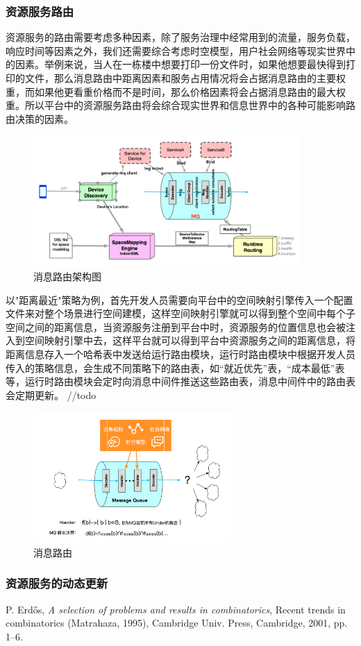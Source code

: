 \documentclass[a4paper]{article}
\theoremstyle{definition}
\begin{document}
\subsubsection{资源服务路由}
资源服务的路由需要考虑多种因素，除了服务治理中经常用到的流量，服务负载，响应时间等因素之外，我们还需要综合考虑时空模型，用户社会网络等现实世界中的因素。举例来说，当人在一栋楼中想要打印一份文件时，如果他想要最快得到打印的文件，那么消息路由中距离因素和服务占用情况将会占据消息路由的主要权重，而如果他更看重价格而不是时间，那么价格因素将会占据消息路由的最大权重。所以平台中的资源服务路由将会综合现实世界和信息世界中的各种可能影响路由决策的因素。
\begin{figure}[ht]
 \centering
 \includegraphics[height=5cm]{images/routing_1.png}
 \caption{消息路由架构图}
 \label{fig:singleblock}
\end{figure}
以"距离最近"策略为例，首先开发人员需要向平台中的空间映射引擎传入一个配置文件来对整个场景进行空间建模，这样空间映射引擎就可以得到整个空间中每个子空间之间的距离信息，当资源服务注册到平台中时，资源服务的位置信息也会被注入到空间映射引擎中去，这样平台就可以得到平台中资源服务之间的距离信息，将距离信息存入一个哈希表中发送给运行路由模块，运行时路由模块中根据开发人员传入的策略信息，会生成不同策略下的路由表，如“就近优先”表，“成本最低”表等，运行时路由模块会定时向消息中间件推送这些路由表，消息中间件中的路由表会定期更新。
//todo
\begin{figure}[ht]
 \centering
 \includegraphics[height=5cm]{images/routing.png}
 \caption{消息路由}
 \label{fig:singleblock}
\end{figure}
\subsubsection{资源服务的动态更新}

\newpage

\begin{thebibliography}{9}
 P. Erd\H os, \emph{A selection of problems and
results in combinatorics}, Recent trends in combinatorics (Matrahaza,
1995), Cambridge Univ. Press, Cambridge, 2001, pp. 1--6.
\end{thebibliography}
\end{document}
